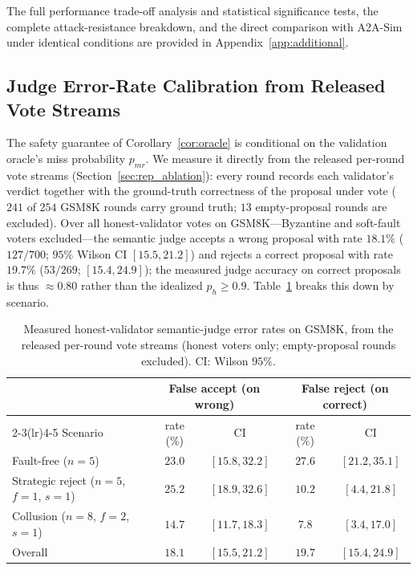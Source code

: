 \documentclass{article}
\begin{document}
The full performance trade-off analysis and statistical significance tests, the complete attack-resistance breakdown, and the direct comparison with A2A-Sim under identical conditions are provided in Appendix~\ref{app:additional}.

\subsection{Judge Error-Rate Calibration from Released Vote Streams}\label{app:judge_calib}

The safety guarantee of Corollary~\ref{cor:oracle} is conditional on the validation oracle's miss probability $p_{\mathit{mr}}$. We measure it directly from the released per-round vote streams (Section~\ref{sec:rep_ablation}): every round records each validator's verdict together with the ground-truth correctness of the proposal under vote ($241$ of $254$ GSM8K rounds carry ground truth; $13$ empty-proposal rounds are excluded). Over all honest-validator votes on GSM8K---Byzantine and soft-fault voters excluded---the semantic judge accepts a wrong proposal with rate $18.1\%$ ($127/700$; $95\%$ Wilson CI $[15.5, 21.2]$) and rejects a correct proposal with rate $19.7\%$ ($53/269$; $[15.4, 24.9]$); the measured judge accuracy on correct proposals is thus $\approx 0.80$ rather than the idealized $p_h \geq 0.9$. Table~\ref{tab:judge_calib} breaks this down by scenario.

\begin{table}[htbp]
\centering\small
\caption{Measured honest-validator semantic-judge error rates on GSM8K, from the released per-round vote streams (honest voters only; empty-proposal rounds excluded). CI: Wilson $95\%$.}
\label{tab:judge_calib}
\begin{tabular}{lcccc}
\toprule
 & \multicolumn{2}{c}{False accept (on wrong)} & \multicolumn{2}{c}{False reject (on correct)} \\
\cmidrule(lr){2-3}\cmidrule(lr){4-5}
Scenario & rate (\%) & CI & rate (\%) & CI \\
\midrule
Fault-free ($n{=}5$) & $23.0$ & $[15.8, 32.2]$ & $27.6$ & $[21.2, 35.1]$ \\
Strategic reject ($n{=}5$, $f{=}1$, $s{=}1$) & $25.2$ & $[18.9, 32.6]$ & $10.2$ & $[4.4, 21.8]$ \\
Collusion ($n{=}8$, $f{=}2$, $s{=}1$) & $14.7$ & $[11.7, 18.3]$ & $7.8$ & $[3.4, 17.0]$ \\
\midrule
Overall & $\mathbf{18.1}$ & $[15.5, 21.2]$ & $\mathbf{19.7}$ & $[15.4, 24.9]$ \\
\bottomrule
\end{tabular}
\end{table}
\end{document}
